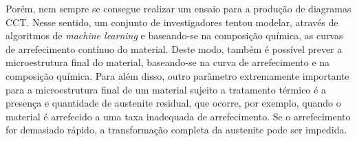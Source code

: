 \par
Porém, nem sempre se consegue realizar um ensaio para a produção de diagramas CCT. Nesse sentido, um conjunto de investigadores tentou modelar, através de algoritmos de \textit{machine learning} e baseando-se na composição química, as curvas de arrefecimento contínuo do material\cite{Martin2020}. Deste modo, também é possível prever a microestrutura final do material, baseando-se na curva de arrefecimento e na composição química. Para além disso, outro parâmetro extremamente importante para a microestrutura final de um material sujeito a tratamento térmico é a presença e quantidade de austenite residual, que ocorre, por exemplo, quando o material é arrefecido a uma taxa inadequada de arrefecimento. Se o arrefecimento for demasiado rápido, a transformação completa da austenite pode ser impedida.
\newpage
